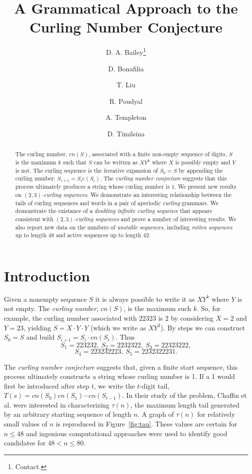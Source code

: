 \documentclass[11pt]{article}
\def\emph#1{{\em #1\/}}
\def\term#1{\emph{#1}}
\def\tail#1{{\tau(#1)}}
\def\twth{$(2,3)$}
\begin{document}
\title{A Grammatical Approach to the Curling Number Conjecture}
\author{D. A. Bailey\thanks{Contact.}\and D. Bonafilia\and T. Liu\and R. Poudyal\and A. Templeton\and D. Timilsina}
\maketitle

\begin{abstract}
The curling number, $cn(S)$, associated with a finite non-empty sequence of
digits, $S$ is the maximum $k$ such that $S$ can be written as $XY^k$ where $X$
is possibly empty and $Y$ is not.  The curling sequence is the iterative
expansion of $S_0=S$ by appending the curling number: $S_{i+1}=S_ic(S_i)$.  
The \term{curling number conjecture} suggests that this process ultimately
produces a string whose curling number is $1$.  We present new results on
\term{\twth-curling sequences}.  We demonstrate an interesting relationship
between the tails of curling sequences and words in a pair of aperiodic \term{curling} grammars.  We demonstrate the existance of a \term{doubling infinite curling sequence}
that appears consistent with \term{\twth-curling sequences} and prove a number
of interesting results.  We also report new data on the numbers of
\term{unstable sequences}, including
\term{rotten sequences} up to length $48$ and active sequences up to length
$42$.
\end{abstract}

\section{Introduction}
 Given a nonempty sequence $S$ it is always possible to write it as $XY^k$
where $Y$ is not empty.  The \term{curling number}, $cn(S)$, is the maximum
such $k$.  So, for example, the curling number associated with $2 2 3 2 3$ is $2$ by considering $X=2$ and $Y=2 3$, yielding $S=X\cdot Y\cdot Y$ (which we
write as $XY^2$).  By steps we can construct $S_0=S$ and build $S_{i+1}=S_i\cdot cn(S_i)$.  Thus $$S_1=2 2 3 2 3 2,~S_2=2 2 3 2 3 2 2,~S_3=2 2 3 2 3 2 2 2,$$ $$S_4=2 2 3 2 3 2 2 2 3,~S_5=2 2 3 2 3 2 2 2 3 1.$$

The \term{curling number conjecture} suggests that, given a finite start
sequence, this process ultimately constructs a string whose curling number is
1.  If a 1 would first be introduced after step $t$, we write the $t$-digit
tail, $T(s)=cn(S_0)cn(S_1)\cdots cn(S_{t-1})$.  In their study of the problem,
Chaffin et al.\cite{Ch13} were interested in characterizing $\tail{n}$, the maximum
length tail generated by an arbitrary starting sequence of length $n$.
A graph of $\tail{n}$ for relatively small values of $n$ is reproduced in
Figure~\ref{fig:tau}.  These values are certain for $n\le 48$ and ingenious
computational approaches were used to identify good candidates for $48<n\le 80$.
\end{document}
